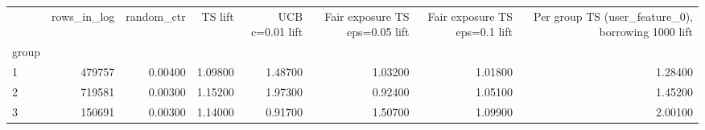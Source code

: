 \begin{tabular}{lrrrrrrr}
\toprule
 & rows\_in\_log & random\_ctr & TS lift & UCB c=0.01 lift & Fair exposure TS eps=0.05 lift & Fair exposure TS eps=0.1 lift & Per group TS (user\_feature\_0), borrowing 1000 lift \\
group &  &  &  &  &  &  &  \\
\midrule
1 & 479757 & 0.00400 & 1.09800 & 1.48700 & 1.03200 & 1.01800 & 1.28400 \\
2 & 719581 & 0.00300 & 1.15200 & 1.97300 & 0.92400 & 1.05100 & 1.45200 \\
3 & 150691 & 0.00300 & 1.14000 & 0.91700 & 1.50700 & 1.09900 & 2.00100 \\
\bottomrule
\end{tabular}
